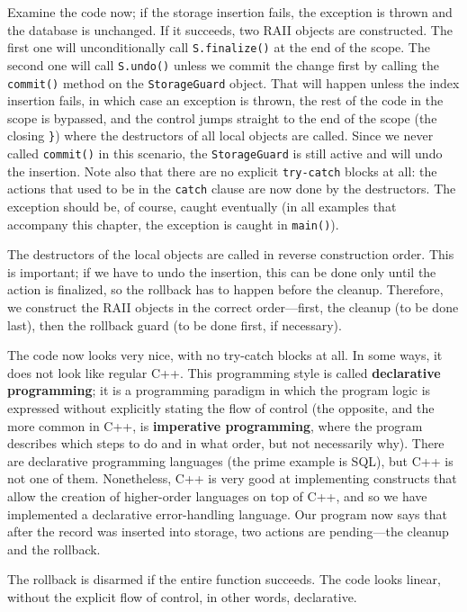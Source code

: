 Examine the code now; if the storage insertion fails, the exception is thrown and the database is unchanged. If it succeeds, two RAII objects are constructed. The first one will unconditionally call \texttt{S.finalize()} at the end of the scope. The second one will call \texttt{S.undo()} unless we commit the change first by calling the \texttt{commit()} method on the \texttt{StorageGuard} object. That will happen unless the index insertion fails, in which case an exception is thrown, the rest of the code in the scope is bypassed, and the control jumps straight to the end of the scope (the closing \texttt{\}}) where the destructors of all local objects are called. Since we never called \texttt{commit()} in this scenario, the \texttt{StorageGuard} is still active and will undo the insertion. Note also that there are no explicit \texttt{try-catch} blocks at all: the actions that used to be in the \texttt{catch} clause are now done by the destructors. The exception should be, of course, caught eventually (in all examples that accompany this chapter, the exception is caught in \texttt{main()}).

The destructors of the local objects are called in reverse construction order. This is important; if we have to undo the insertion, this can be done only until the action is finalized, so the rollback has to happen before the cleanup. Therefore, we construct the RAII objects in the correct order---first, the cleanup (to be done last), then the rollback guard (to be done first, if necessary).

The code now looks very nice, with no try-catch blocks at all. In some ways, it does not look like regular C++. This programming style is called \textbf{declarative programming}; it is a programming paradigm in which the program logic is expressed without explicitly stating the flow of control (the opposite, and the more common in C++, is \textbf{imperative programming}, where the program describes which steps to do and in what order, but not necessarily why). There are declarative programming languages (the prime example is SQL), but C++ is not one of them. Nonetheless, C++ is very good at implementing constructs that allow the creation of higher-order languages on top of C++, and so we have implemented a declarative error-handling language. Our program now says that after the record was inserted into storage, two actions are pending---the cleanup and the rollback.

The rollback is disarmed if the entire function succeeds. The code looks linear, without the explicit flow of control, in other words, declarative.

